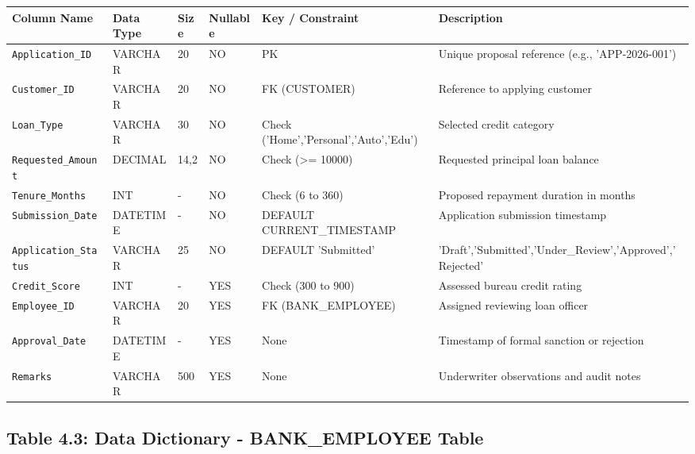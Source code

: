 \documentclass[12pt,a4paper,oneside]{report}
\begin{document}
\begin{table}[htbp]
\centering
\small
\begin{tabularx}{\textwidth}{p{2.5cm} X X X X X}
\toprule
\textbf{Column Name} & \textbf{Data Type} & \textbf{Size} & \textbf{Nullable} & \textbf{Key / Constraint} & \textbf{Description} \\
\midrule
\texttt{Application\_ID} & VARCHAR & 20 & NO & PK & Unique proposal reference (e.g., 'APP-2026-001') \\
\texttt{Customer\_ID} & VARCHAR & 20 & NO & FK (CUSTOMER) & Reference to applying customer \\
\texttt{Loan\_Type} & VARCHAR & 30 & NO & Check ('Home','Personal','Auto','Edu') & Selected credit category \\
\texttt{Requested\_Amount} & DECIMAL & 14,2 & NO & Check (>= 10000) & Requested principal loan balance \\
\texttt{Tenure\_Months} & INT & - & NO & Check (6 to 360) & Proposed repayment duration in months \\
\texttt{Submission\_Date} & DATETIME & - & NO & DEFAULT CURRENT\_TIMESTAMP & Application submission timestamp \\
\texttt{Application\_Status} & VARCHAR & 25 & NO & DEFAULT 'Submitted' & 'Draft','Submitted','Under\_Review','Approved','Rejected' \\
\texttt{Credit\_Score} & INT & - & YES & Check (300 to 900) & Assessed bureau credit rating \\
\texttt{Employee\_ID} & VARCHAR & 20 & YES & FK (BANK\_EMPLOYEE) & Assigned reviewing loan officer \\
\texttt{Approval\_Date} & DATETIME & - & YES & None & Timestamp of formal sanction or rejection \\
\texttt{Remarks} & VARCHAR & 500 & YES & None & Underwriter observations and audit notes \\
\bottomrule
\end{tabularx}
\end{table}

\subsection{Table 4.3: Data Dictionary - BANK\_EMPLOYEE Table}
\end{document}
